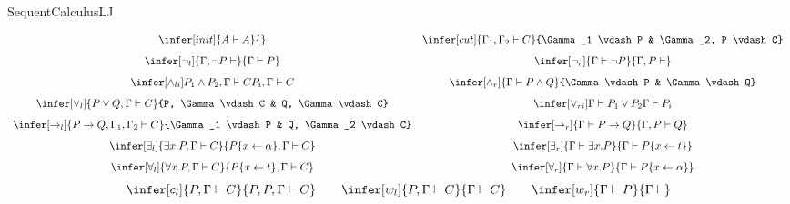 \begin{entry}{SequentCalculusLJ}  



\begin{calculus}

\[
\begin{array}{cc}
\infer[init]{A \vdash A}{}
&
\infer[cut]{\Gamma_1, \Gamma_2 \vdash C}{\Gamma_1 \vdash P & \Gamma_2, P \vdash C}
\\[8pt]
\infer[\neg_l]{\Gamma, \neg P \vdash }{\Gamma \vdash P}
&
\infer[\neg_r]{\Gamma \vdash \neg P}{\Gamma, P \vdash }
\\[8pt]
\infer[\wedge_{li}]{P_1 \wedge P_2, \Gamma \vdash C}{P_i, \Gamma \vdash C}
&
\infer[\wedge_r]{\Gamma \vdash P \wedge Q}{\Gamma \vdash P & \Gamma \vdash Q}
\\[8pt]
\infer[\vee_l]{P \vee Q, \Gamma \vdash C}{P, \Gamma \vdash C & Q, \Gamma \vdash C}
&
\infer[\vee_{ri}]{\Gamma \vdash P_1 \vee P_2}{\Gamma \vdash P_i}
\\[8pt]
\infer[\rightarrow_l]{P \rightarrow Q, \Gamma_1, \Gamma_2 \vdash C}{\Gamma_1
\vdash P & Q, \Gamma_2 \vdash C}
&
\infer[\rightarrow_r]{\Gamma \vdash P \rightarrow Q}{\Gamma, P \vdash Q}
\\[8pt]
\infer[\exists_l]{\exists x.P, \Gamma \vdash C}{P\{x \leftarrow
\alpha\}, \Gamma \vdash C}
&
\infer[\exists_r]{\Gamma \vdash \exists x.P}{\Gamma \vdash P\{x
\leftarrow t\}}
\\[8pt]
\infer[\forall_l]{\forall x.P, \Gamma \vdash C}{P\{x \leftarrow t\}, \Gamma \vdash C}
&
\infer[\forall_r]{\Gamma \vdash \forall x.P}{\Gamma \vdash P\{x
\leftarrow \alpha \}}
\\
\end{array}
\]
$$
\infer[c_l]{P, \Gamma \vdash C}{P, P, \Gamma \vdash C}
\qquad
\infer[w_l]{P, \Gamma \vdash C}{\Gamma \vdash C}
\qquad
\infer[w_r]{\Gamma \vdash P}{\Gamma \vdash}
$$

\end{calculus}



\end{entry}
